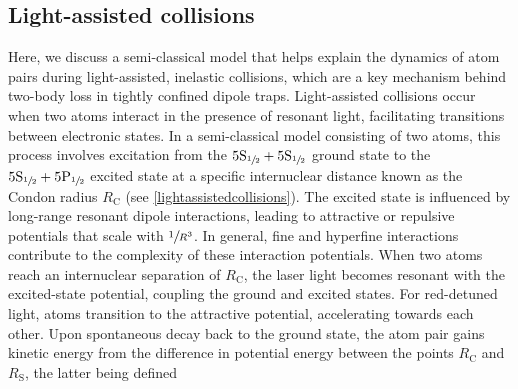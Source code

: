 \documentclass[../Thesis-IJspeert.tex]{subfiles}
\begin{document}
\subsection{Light-assisted collisions}
Here, we discuss a semi-classical model that helps explain the dynamics of atom pairs during light-assisted, inelastic collisions, which are a key mechanism behind two-body loss in tightly confined dipole traps. Light-assisted collisions occur when two atoms interact in the presence of resonant light, facilitating transitions between electronic states. In a semi-classical model consisting of two  atoms, this process involves excitation from the $5\mathrm{S}_{\sfrac{1}{2}}+5\mathrm{S}_{\sfrac{1}{2}}$ ground state to the $5\mathrm{S}_{\sfrac{1}{2}}+5\mathrm{P}_{\sfrac{1}{2}}$ excited state at a specific internuclear distance known as the Condon radius $R_\mathrm{C}$ (see \autoref{lightassistedcollisions}). The excited state is influenced by long-range resonant dipole interactions, leading to attractive or repulsive potentials that scale with $\sfrac{1}{R^3}$. In general, fine and hyperfine interactions contribute to the complexity of these interaction potentials. When two atoms reach an internuclear separation of $R_\mathrm{C}$, the laser light becomes resonant with the excited-state potential, coupling the ground and excited states. For red-detuned light, atoms transition to the attractive potential, accelerating towards each other. Upon spontaneous decay back to the ground state, the atom pair gains kinetic energy from the difference in potential energy between the points $R_\mathrm{C}$ and $R_\mathrm{S}$, the latter being defined 
\end{document}
